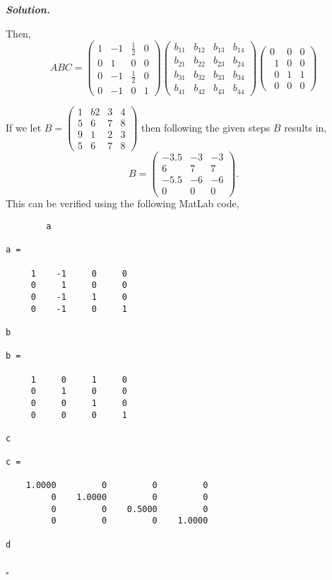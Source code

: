 \documentclass[12pt]{report}
\newenvironment{solution}[1][\it{Solution}]{\textbf{#1. } }{$\square$}
\begin{document}
\begin{solution}
\begin{enumerate}
        Then,
        $$ABC = \begin{pmatrix}1&-1&\frac{1}{2}&0\\ 0&1&0&0\\ 0&-1&\frac{1}{2}&0\\ 0&-1&0&1\end{pmatrix}\begin{pmatrix}b_{11}&b_{12}&b_{13}&b_{14}\\ b_{21}&b_{22}&b_{23}&b_{24}\\ b_{31}&b_{32}&b_{33}&b_{34}\\ b_{41}&b_{42}&b_{43}&b_{44}\end{pmatrix}\begin{pmatrix}0&0&0\\ \:\:1&0&0\\ \:\:0&1&1\\ \:\:0&0&0\end{pmatrix}$$
    \end{enumerate}
    If we let $B = \begin{pmatrix}1&b2&3&4\\ 5&6&7&8\\ 9&1&2&3\\ 5&6&7&8\end{pmatrix}$ then following the given steps $B$ results in,
    $$B = \begin{pmatrix}-3.5&-3&-3\\ 6&7&7\\ -5.5&-6&-6\\ 0&0&0\end{pmatrix}.$$ This can be verified using the following MatLab code,



    \begin{verbatim} 
        a

a =

     1    -1     0     0
     0     1     0     0
     0    -1     1     0
     0    -1     0     1

b

b =

     1     0     1     0
     0     1     0     0
     0     0     1     0
     0     0     0     1

c

c =

    1.0000         0         0         0
         0    1.0000         0         0
         0         0    0.5000         0
         0         0         0    1.0000

d


\end{verbatim}
\end{solution}
\end{document}
